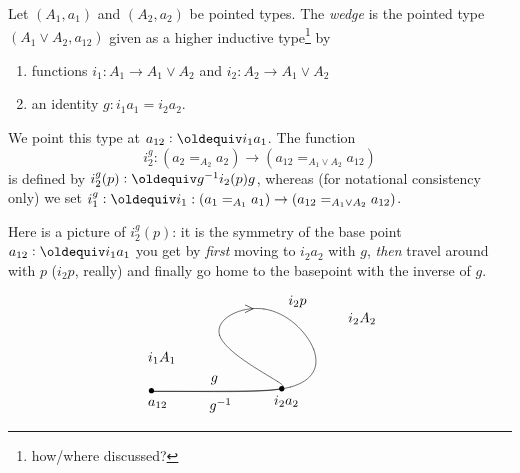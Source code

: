 \begin{definition}
  \label{def:wedge}
  Let $(A_1,a_1)$ and $(A_2,a_2)$ be pointed types.  The \emph{wedge} is the pointed type $(A_1\vee A_2,a_{12})$ given as a higher inductive type\footnote{how/where discussed?} by
  \begin{enumerate}
  \item functions $i_1:A_1\to A_1\vee A_2$ and $i_2:A_2\to A_1\vee A_2$
  \item an identity $g:i_1a_1=i_2a_2$.
  \end{enumerate}
We point this type at $a_{12}\defequi i_1a_1$.
  The function 
$$i^g_2:(a_2=_{A_2}a_2)\to(a_{12}=_{A_1\vee A_2}a_{12})$$ 
is defined by $i^g_2(p)\defequi g^{-1}i_2(p)g$, whereas (for notational consistency only) we set $i_1^g\defequi i_1:(a_1=_{A_1}a_1)\to(a_{12}=_{A_1\vee A_2}a_{12})$.
\end{definition}

Here is a picture of $i_2^g(p)$: it is the symmetry of the base point $a_{12}\defequi i_1a_1$ you get by \emph{first} moving to $i_2a_2$ with $g$, \emph{then} travel around with $p$ ($i_2p$, really) and finally go home to the basepoint with the inverse of $g$.

$$
\xy (-20,20)*+{};(-20,20)*+{}
**\crv{(15,20)&(18,20)&(-10,35)&(10,45)&(25,30)&(20,19)&(0,20)}
?(0)*{} *!LD!/^-20pt/{i_1A_1}
?(.45)*{} *!LD!/^2pt/{>}
?(.95)*{} *!LD!/^-15pt/{g^{-1}}
?(.03)*{} *!LD!/^-5pt/{g}
?(.55)*{} *!LD!/^-7pt/{i_2p}
?(.65)*{} *!LD!/^-30pt/{i_2A_2}
?(.87)*{} *!LD!/^-12pt/{i_2a_2}
?(.86)*{} *!LD!/^-2pt/{\bullet}
?(1)*{} *!LD!/^-2pt/{\bullet}
?(1)*{} *!LD!/^-12pt/{a_{12}}
\endxy
$$

